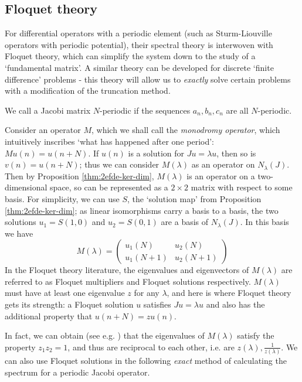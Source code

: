 \documentclass[../main.tex]{subfiles}
\begin{document}
\subsection{Floquet theory}
For differential operators with a periodic element
(such as Sturm-Liouville operators with periodic potential), their spectral
theory is interwoven with Floquet theory, which can simplify the system down to
the study of a `fundamental matrix'. A similar theory can be developed for
discrete `finite difference' problems - this theory will allow us to
\emph{exactly} solve certain problems with a modification of the truncation
method.

We call a Jacobi matrix $N$-periodic if the sequences $a_n, b_n, c_n$ are all
$N$-periodic.

Consider an operator $M$, which we shall call the \emph{monodromy
operator}, which intuitively inscribes `what has
happened after one period': $Mu(n) = u(n+N)$. If $u(n)$ is a solution for $Ju =
\lambda u$, then so is $v(n) = u(n+N)$; thus we can consider $M(\lambda)$ as an
operator on $N_\lambda (J)$. Then by Proposition \ref{thm:2efde-ker-dim},
$M(\lambda)$ is an operator on a two-dimensional space, so can be represented as
a $2 \times 2$ matrix with respect to some basis. For simplicity, we can use
$S$, the `solution map' from Proposition \ref{thm:2efde-ker-dim}; as linear
isomorphisms carry a basis to a basis, the two solutions $u_1 = S(1, 0)$ and
$u_2 = S(0, 1)$ are a basis of $N_\lambda (J)$. In this basis we have
  $$
  M(\lambda) =
  \begin{pmatrix}
    u_1(N) & u_2(N) \\
    u_1(N+1) & u_2(N+1)
  \end{pmatrix}
  $$
In the Floquet theory literature, the eigenvalues and eigenvectors of
$M(\lambda)$ are referred to as Floquet multipliers and Floquet solutions
respectively. $M(\lambda)$ must have at least one eigenvalue $z$ for any
$\lambda$, and here is where Floquet theory gets its strength: a Floquet
solution $u$ satisfies $Ju = \lambda u$ and also has the additional property
that $u(n+N) = zu(n).$

In fact, we can obtain (see e.g. \cite{teschl2000jacobi}) that the eigenvalues
of $M(\lambda)$ satisfy the property $z_1 z_2 = 1$, and thus are reciprocal to
each other, i.e. are $z(\lambda), \frac{1}{z(\lambda)}$. We can also use
Floquet solutions in the following \emph{exact} method of calculating
the spectrum for a periodic Jacobi operator.
\end{document}
